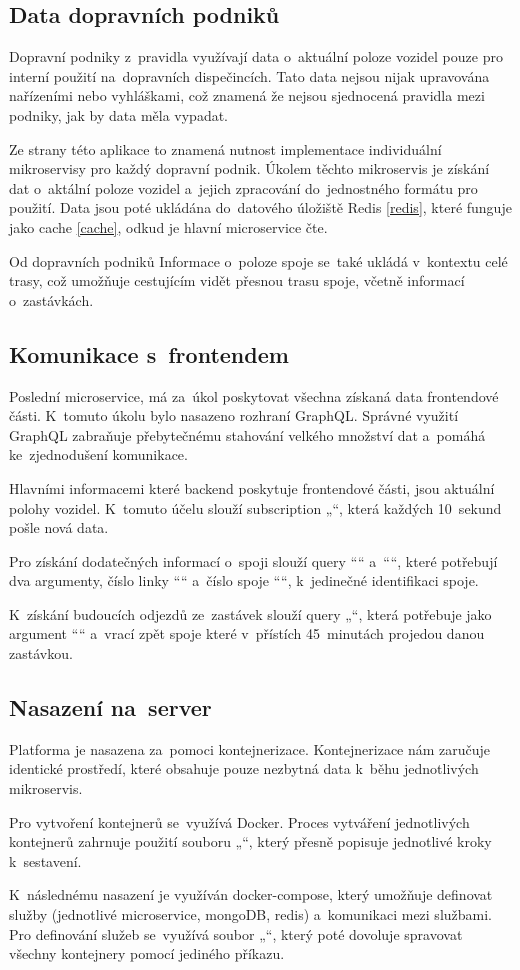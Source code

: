 \subsection {Data dopravních podniků}
Dopravní podniky z~pravidla využívají data o~aktuální poloze vozidel pouze pro interní použití na~dopravních dispečincích. Tato data nejsou nijak upravována nařízeními nebo vyhláškami, což znamená že nejsou sjednocená pravidla mezi podniky, jak by data měla vypadat.\par
Ze strany této aplikace to znamená nutnost implementace individuální mikroservisy pro každý dopravní podnik. Úkolem těchto mikroservis je získání dat o~aktální poloze vozidel a~jejich zpracování do~jednostného formátu pro použití. Data jsou poté ukládána do~datového úložiště Redis \ref{redis}, které funguje jako cache \ref{cache}, odkud je hlavní microservice čte.\par
Od dopravních podniků Informace o~poloze spoje se~také ukládá v~kontextu celé trasy, což umožňuje cestujícím vidět přesnou trasu spoje, včetně informací o~zastávkách.
\subsection {Komunikace s~frontendem}\label{mainBackend}
Poslední microservice, má za~úkol poskytovat všechna získaná data frontendové části. K~tomuto úkolu bylo nasazeno rozhraní GraphQL. Správné využití GraphQL zabraňuje přebytečnému stahování velkého množství dat a~pomáhá ke~zjednodušení komunikace. \cite{graphqlData} \par
Hlavními informacemi které backend poskytuje frontendové části, jsou aktuální polohy vozidel. K~tomuto účelu slouží subscription „“, která každých 10~sekund pošle nová data.\par
Pro získání dodatečných informací o~spoji slouží query ““ \newline a~““, které potřebují dva argumenty, číslo linky ““ \newline a~číslo spoje ““, k~jedinečné identifikaci spoje.\par
K~získání budoucích odjezdů ze~zastávek slouží query „“, která potřebuje jako argument ““ a~vrací zpět spoje které v~přístích 45~minutách projedou danou zastávkou.
\subsection{Nasazení na~server}
Platforma je nasazena za~pomoci kontejnerizace. Kontejnerizace nám zaručuje identické prostředí, které obsahuje pouze nezbytná data k~běhu jednotlivých mikroservis.\par
Pro vytvoření kontejnerů se~využívá Docker. Proces vytváření jednotlivých kontejnerů zahrnuje použití souboru „“, který přesně popisuje jednotlivé kroky k~sestavení.\par
K~následnému nasazení je využíván docker-compose, který umožňuje definovat služby (jednotlivé microservice, mongoDB, redis) a~komunikaci mezi službami. Pro definování služeb se~využívá soubor „“, který poté dovoluje spravovat všechny kontejnery pomocí jediného příkazu.

